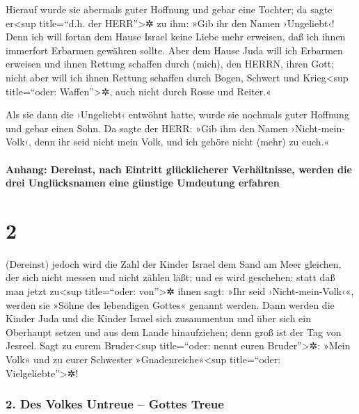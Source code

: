 Hierauf wurde sie abermals guter Hoffnung und gebar eine
Tochter; da sagte er\textless sup title=``d.h. der HERR''\textgreater✲
zu ihm: »Gib ihr den Namen ›Ungeliebt‹! Denn ich will fortan dem Hause
Israel keine Liebe mehr erweisen, daß ich ihnen immerfort Erbarmen
gewähren sollte.  Aber dem Hause Juda will ich Erbarmen
erweisen und ihnen Rettung schaffen durch (mich), den HERRN, ihren Gott;
nicht aber will ich ihnen Rettung schaffen durch Bogen, Schwert und
Krieg\textless sup title=``oder: Waffen''\textgreater✲, auch nicht durch
Rosse und Reiter.«

 Als sie dann die ›Ungeliebt‹ entwöhnt hatte, wurde sie
nochmals guter Hoffnung und gebar einen Sohn.  Da sagte
der HERR: »Gib ihm den Namen ›Nicht-mein-Volk‹, denn ihr seid nicht mein
Volk, und ich gehöre nicht (mehr) zu euch.«

\hypertarget{anhang-dereinst-nach-eintritt-gluxfccklicherer-verhuxe4ltnisse-werden-die-drei-ungluxfccksnamen-eine-guxfcnstige-umdeutung-erfahren}{%
\paragraph{Anhang: Dereinst, nach Eintritt glücklicherer Verhältnisse,
werden die drei Unglücksnamen eine günstige Umdeutung
erfahren}\label{anhang-dereinst-nach-eintritt-gluxfccklicherer-verhuxe4ltnisse-werden-die-drei-ungluxfccksnamen-eine-guxfcnstige-umdeutung-erfahren}}

\hypertarget{section-1}{%
\section{2}\label{section-1}}

 (Dereinst) jedoch wird die Zahl der Kinder Israel dem
Sand am Meer gleichen, der sich nicht messen und nicht zählen läßt; und
es wird geschehen: statt daß man jetzt zu\textless sup title=``oder:
von''\textgreater✲ ihnen sagt: »Ihr seid ›Nicht-mein-Volk‹«, werden sie
»Söhne des lebendigen Gottes« genannt werden.  Dann werden
die Kinder Juda und die Kinder Israel sich zusammentun und über sich ein
Oberhaupt setzen und aus dem Lande hinaufziehen; denn groß ist der Tag
von Jesreel.  Sagt zu eurem Bruder\textless sup
title=``oder: nennt euren Bruder''\textgreater✲: »Mein Volk« und zu
eurer Schwester »Gnadenreiche«\textless sup title=``oder:
Vielgeliebte''\textgreater✲!

\hypertarget{des-volkes-untreue-gottes-treue}{%
\subsubsection{2. Des Volkes Untreue -- Gottes
Treue}\label{des-volkes-untreue-gottes-treue}}

